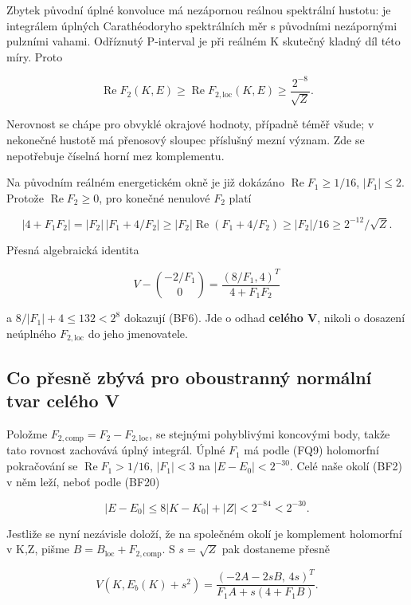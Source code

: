 \documentclass[11pt,a4paper]{article}
\theoremstyle{remark}\newtheorem{remark}[theorem]{Poznámka}
\numberwithin{equation}{section}
\begin{document}
Zbytek původní úplné konvoluce má nezápornou reálnou spektrální hustotu:
je integrálem úplných Carathéodoryho spektrálních měr s původními
nezápornými pulzními vahami. Odříznutý P-interval je při reálném K
skutečný kladný díl této míry. Proto

\[
\operatorname{Re}F_2(K,E)\ge
\operatorname{Re}F_{2,\mathrm{loc}}(K,E)
\ge\frac{2^{-8}}{\sqrt Z}.
\tag{BF31}
\]

Nerovnost se chápe pro obvyklé okrajové hodnoty, případně téměř všude; v
nekonečné hustotě má přenosový sloupec příslušný mezní význam. Zde se
nepotřebuje číselná horní mez komplementu.

Na původním reálném energetickém okně je již dokázáno
\(\operatorname{Re}F_1\ge1/16\), \(|F_1|\le2\). Protože
\(\operatorname{Re}F_2\ge0\), pro konečné nenulové \(F_2\) platí

\[
|4+F_1F_2|=|F_2|\,|F_1+4/F_2|
\ge |F_2|\operatorname{Re}(F_1+4/F_2)
\ge |F_2|/16\ge 2^{-12}/\sqrt Z.
\]

Přesná algebraická identita

\[
V-\binom{-2/F_1}{0}
=\frac{(8/F_1,4)^T}{4+F_1F_2}
\tag{BF32}
\]

a \(8/|F_1|+4\le132<2^8\) dokazují (BF6). Jde o odhad \textbf{celého V},
nikoli o dosazení neúplného \(F_{2,\mathrm{loc}}\) do jeho jmenovatele.

\hypertarget{co-pux159esnux11b-zbuxfdvuxe1-pro-oboustrannuxfd-normuxe1lnuxed-tvar-celuxe9ho-v}{%
\subsection{Co přesně zbývá pro oboustranný normální tvar celého
V}\label{co-pux159esnux11b-zbuxfdvuxe1-pro-oboustrannuxfd-normuxe1lnuxed-tvar-celuxe9ho-v}}

Položme \(F_{2,\mathrm{comp}}=F_2-F_{2,\mathrm{loc}}\), se stejnými
pohyblivými koncovými body, takže tato rovnost zachovává úplný integrál.
Úplné \(F_1\) má podle (FQ9) holomorfní pokračování se
\(\operatorname{Re}F_1>1/16\), \(|F_1|<3\) na \(|E-E_0|<2^{-30}\). Celé
naše okolí (BF2) v něm leží, neboť podle (BF20)

\[
|E-E_0|\le8|K-K_0|+|Z|<2^{-84}<2^{-30}.
\]

Jestliže se nyní nezávisle doloží, že na společném okolí je komplement
holomorfní v K,Z, pišme \(B=B_{\mathrm{loc}}+F_{2,\mathrm{comp}}\). S
\(s=\sqrt Z\) pak dostaneme přesně

\[
\boxed{
V(K,E_b(K)+s^2)
=\frac{(-2A-2sB,\,4s)^T}{F_1A+s(4+F_1B)}.}
\tag{BF33}
\]
\end{document}
